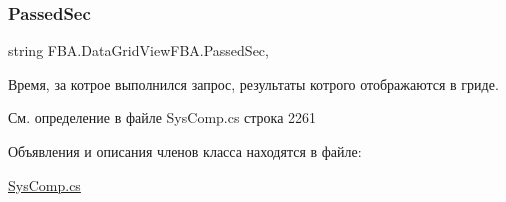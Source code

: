 \subsubsection{\texorpdfstring{Passed\+Sec}{PassedSec}}
{\footnotesize\ttfamily string F\+B\+A.\+Data\+Grid\+View\+F\+B\+A.\+Passed\+Sec\hspace{0.3cm}{\ttfamily [get]}, {\ttfamily [set]}}



Время, за котрое выполнился запрос, результаты котрого отображаются в гриде. 



См. определение в файле Sys\+Comp.\+cs строка 2261



Объявления и описания членов класса находятся в файле\+:\begin{DoxyCompactItemize}
\item 
\mbox{\hyperlink{_sys_comp_8cs}{Sys\+Comp.\+cs}}\end{DoxyCompactItemize}

